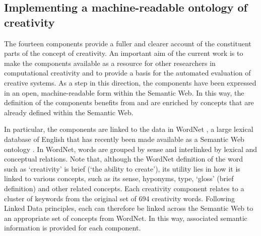 \documentclass[10pt,letterpaper]{article}
\begin{document}
\subsection*{Implementing a machine-readable ontology of creativity}\label{creativityOntology}

The fourteen components provide a fuller and clearer account of the constituent parts of the concept of creativity. An important aim of the current work is to make the components available as a resource for other researchers in computational creativity and to provide a basis for the automated evaluation of creative systems. As a step in this direction, the components have been expressed in an open, machine-readable form within the Semantic Web. In this way, the definition of the components benefits from and are enriched by concepts that are already defined within the Semantic Web. %

In particular, the components are linked to the data in WordNet \cite{fellbaum98}, a large lexical database of English that has recently been made available as a Semantic Web ontology \cite{wordnetRKB}. In WordNet, words are grouped by sense and interlinked by lexical and conceptual relations. Note that, although the WordNet definition of the word such as `creativity' is brief (`the ability to create'), its utility lies in how it is linked to various concepts, such as its sense, hyponyms, type, `gloss' (brief definition) and other related concepts. Each creativity component relates to a cluster of keywords from the original set of 694 creativity words. Following Linked Data principles, each can therefore be linked across the Semantic Web to an appropriate set of concepts from WordNet. In this way,  associated semantic information is provided for each component. 
\end{document}
